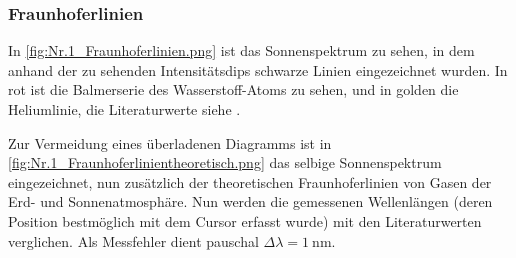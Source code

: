 \subsubsection{Fraunhoferlinien}
In \cref{fig:Nr.1_Fraunhoferlinien.png} ist das Sonnenspektrum zu sehen, in dem anhand der zu sehenden Intensitätsdips schwarze Linien eingezeichnet wurden. In rot ist die Balmerserie des Wasserstoff-Atoms zu sehen, und in golden die Heliumlinie, die Literaturwerte siehe \autocite{Skript_2.1}.\par
{}
Zur Vermeidung eines überladenen Diagramms ist in \cref{fig:Nr.1_Fraunhoferlinientheoretisch.png} das selbige Sonnenspektrum eingezeichnet, nun zusätzlich der theoretischen Fraunhoferlinien von Gasen der Erd- und Sonnenatmosphäre.
Nun werden die gemessenen Wellenlängen (deren Position bestmöglich mit dem Cursor erfasst wurde) mit den Literaturwerten verglichen. Als Messfehler dient pauschal \(\Delta \lambda=\qty{1}{\nano\m}\).
\newpage

